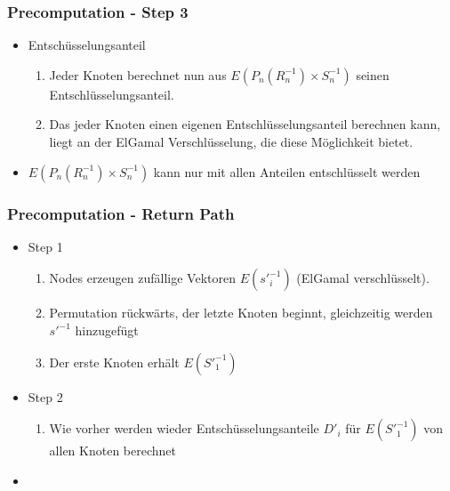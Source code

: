 \documentclass[t, xcolor=dvipsnames]{beamer}
\begin{document}
\begin{frame}
	\frametitle{Precomputation - Step 3}
	\begin{itemize}
		\item Entschüsselungsanteil
		\begin{enumerate}
			\item Jeder Knoten berechnet nun aus $E(P_n(R_n^{-1}) \times S_n^{-1})$ seinen Entschlüsselungsanteil.
			\item Das jeder Knoten einen eigenen Entschlüsselungsanteil berechnen kann, liegt an der ElGamal Verschlüsselung, die diese Möglichkeit bietet.
			
		\end{enumerate}
		
	\item $E(P_n(R_n^{-1}) \times S_n^{-1})$ kann nur mit allen Anteilen entschlüsselt werden
	\end{itemize}
	\vspace{\fill}
\end{frame}

\begin{frame}
	\frametitle{Precomputation - Return Path}
	\begin{itemize}
		
		\item Step 1
		\begin{enumerate}
			\item Nodes erzeugen zufällige Vektoren $E({s'}_i^{-1})$ (ElGamal verschlüsselt).
			\item Permutation rückwärts, der letzte Knoten beginnt, gleichzeitig werden $s'^{-1}$ hinzugefügt
			\item Der erste Knoten erhält $E({S'}_1^{-1})$
		\end{enumerate}
		\item Step 2
		\begin{enumerate}
			\item Wie vorher werden wieder Entschüsselungsanteile $D'_i$ für $E({S'}_1^{-1})$ von allen Knoten berechnet
		\end{enumerate}
		\item 
		
		 
	\end{itemize}
	\vspace{\fill}
\end{frame}
\end{document}
